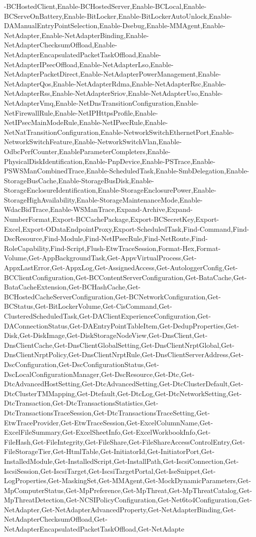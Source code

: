 {{-BCHostedClient,Enable-BCHostedServer,Enable-BCLocal,Enable-BCServeOnBattery,Enable-BitLocker,Enable-BitLockerAutoUnlock,Enable-DAManualEntryPointSelection,Enable-Dsebug,Enable-MMAgent,Enable-NetAdapter,Enable-NetAdapterBinding,Enable-NetAdapterChecksumOffload,Enable-NetAdapterEncapsulatedPacketTaskOffload,Enable-NetAdapterIPsecOffload,Enable-NetAdapterLso,Enable-NetAdapterPacketDirect,Enable-NetAdapterPowerManagement,Enable-NetAdapterQos,Enable-NetAdapterRdma,Enable-NetAdapterRsc,Enable-NetAdapterRss,Enable-NetAdapterSriov,Enable-NetAdapterUso,Enable-NetAdapterVmq,Enable-NetDnsTransitionConfiguration,Enable-NetFirewallRule,Enable-NetIPHttpsProfile,Enable-NetIPsecMainModeRule,Enable-NetIPsecRule,Enable-NetNatTransitionConfiguration,Enable-NetworkSwitchEthernetPort,Enable-NetworkSwitchFeature,Enable-NetworkSwitchVlan,Enable-OdbcPerfCounter,EnableParameterCompleters,Enable-PhysicalDiskIdentification,Enable-PnpDevice,Enable-PSTrace,Enable-PSWSManCombinedTrace,Enable-ScheduledTask,Enable-SmbDelegation,Enable-StorageBusCache,Enable-StorageBusDisk,Enable-StorageEnclosureIdentification,Enable-StorageEnclosurePower,Enable-StorageHighAvailability,Enable-StorageMaintenanceMode,Enable-WdacBidTrace,Enable-WSManTrace,Expand-Archive,Expand-NumberFormat,Export-BCCachePackage,Export-BCSecretKey,Export-Excel,Export-ODataEndpointProxy,Export-ScheduledTask,Find-Command,Find-DscResource,Find-Module,Find-NetIPsecRule,Find-NetRoute,Find-RoleCapability,Find-Script,Flush-EtwTraceSession,Format-Hex,Format-Volume,Get-AppBackgroundTask,Get-AppvVirtualProcess,Get-AppxLastError,Get-AppxLog,Get-AssignedAccess,Get-AutologgerConfig,Get-BCClientConfiguration,Get-BCContentServerConfiguration,Get-BataCache,Get-BataCacheExtension,Get-BCHashCache,Get-BCHostedCacheServerConfiguration,Get-BCNetworkConfiguration,Get-BCStatus,Get-BitLockerVolume,Get-CisCommand,Get-ClusteredScheduledTask,Get-DAClientExperienceConfiguration,Get-DAConnectionStatus,Get-DAEntryPointTableItem,Get-DedupProperties,Get-Disk,Get-DiskImage,Get-DiskStorageNodeView,Get-DnsClient,Get-DnsClientCache,Get-DnsClientGlobalSetting,Get-DnsClientNrptGlobal,Get-DnsClientNrptPolicy,Get-DnsClientNrptRule,Get-DnsClientServerAddress,Get-DscConfiguration,Get-DscConfigurationStatus,Get-DscLocalConfigurationManager,Get-DscResource,Get-Dtc,Get-DtcAdvancedHostSetting,Get-DtcAdvancedSetting,Get-DtcClusterDefault,Get-DtcClusterTMMapping,Get-Dtefault,Get-DtcLog,Get-DtcNetworkSetting,Get-DtcTransaction,Get-DtcTransactionsStatistics,Get-DtcTransactionsTraceSession,Get-DtcTransactionsTraceSetting,Get-EtwTraceProvider,Get-EtwTraceSession,Get-ExcelColumnName,Get-ExcelFileSummary,Get-ExcelSheetInfo,Get-ExcelWorkbookInfo,Get-FileHash,Get-FileIntegrity,Get-FileShare,Get-FileShareAccessControlEntry,Get-FileStorageTier,Get-HtmlTable,Get-InitiatorId,Get-InitiatorPort,Get-InstalledModule,Get-InstalledScript,Get-InstallPath,Get-IscsiConnection,Get-IscsiSession,Get-IscsiTarget,Get-IscsiTargetPortal,Get-IseSnippet,Get-LogProperties,Get-MaskingSet,Get-MMAgent,Get-MockDynamicParameters,Get-MpComputerStatus,Get-MpPreference,Get-MpThreat,Get-MpThreatCatalog,Get-MpThreatDetection,Get-NCSIPolicyConfiguration,Get-Net6to4Configuration,Get-NetAdapter,Get-NetAdapterAdvancedProperty,Get-NetAdapterBinding,Get-NetAdapterChecksumOffload,Get-NetAdapterEncapsulatedPacketTaskOffload,Get-NetAdapte}}
